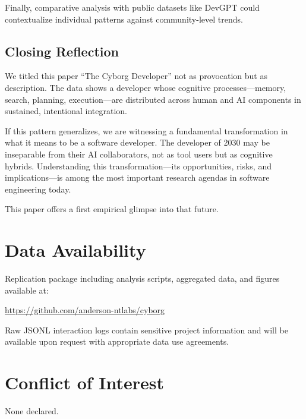 \documentclass{ntlabs-preprint}
\begin{document}
Finally, comparative analysis with public datasets like DevGPT \citep{tao2024devgpt} could contextualize individual patterns against community-level trends.

\subsection{Closing Reflection}

We titled this paper ``The Cyborg Developer'' not as provocation but as description. The data shows a developer whose cognitive processes---memory, search, planning, execution---are distributed across human and AI components in sustained, intentional integration.

If this pattern generalizes, we are witnessing a fundamental transformation in what it means to be a software developer. The developer of 2030 may be inseparable from their AI collaborators, not as tool users but as cognitive hybrids. Understanding this transformation---its opportunities, risks, and implications---is among the most important research agendas in software engineering today.

This paper offers a first empirical glimpse into that future.

\section*{Data Availability}

Replication package including analysis scripts, aggregated data, and figures available at:

\url{https://github.com/anderson-ntlabs/cyborg}

\noindent Raw JSONL interaction logs contain sensitive project information and will be available upon request with appropriate data use agreements.

\section*{Conflict of Interest}

None declared.





\appendix
\end{document}
